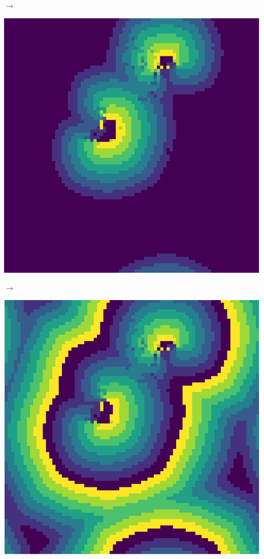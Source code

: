 \documentclass[12pt, a4paper]{article}
\begin{document}
\begin{center}
\begin{minipage}{.17\linewidth}
            \end{minipage}
            $\rightarrow$
            \begin{minipage}{.17\linewidth}
                \includegraphics[scale=0.15]{img/part2/step4.png}
            \end{minipage}
            $\rightarrow$
            \begin{minipage}{.17\linewidth}
                \includegraphics[scale=0.15]{img/part2/step5.png}

\end{minipage}
\end{center}
\end{document}
